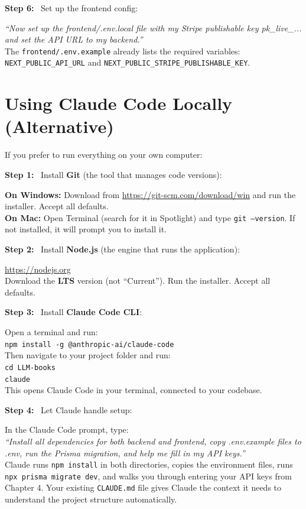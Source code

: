 \documentclass[12pt, letterpaper, oneside]{book}
\newcommand{\step}[1]{\noindent\textbf{\textcolor{primary}{Step #1:}}~}
\begin{document}
\step{6} Set up the frontend config:
\begin{actionbox}
\textit{``Now set up the frontend/.env.local file with my Stripe publishable key pk\_live\_... and set the API URL to my backend.''}\\[4pt]
The \texttt{frontend/.env.example} already lists the required variables: \texttt{NEXT\_PUBLIC\_API\_URL} and \texttt{NEXT\_PUBLIC\_STRIPE\_PUBLISHABLE\_KEY}.
\end{actionbox}

\section{Using Claude Code Locally (Alternative)}

If you prefer to run everything on your own computer:

\step{1} Install \textbf{Git} (the tool that manages code versions):
\begin{actionbox}
\textbf{On Windows:} Download from \url{https://git-scm.com/download/win} and run the installer. Accept all defaults.\\[4pt]
\textbf{On Mac:} Open Terminal (search for it in Spotlight) and type \texttt{git --version}. If not installed, it will prompt you to install it.
\end{actionbox}

\step{2} Install \textbf{Node.js} (the engine that runs the application):
\begin{actionbox}
\url{https://nodejs.org}\\[4pt]
Download the \textbf{LTS} version (not ``Current''). Run the installer. Accept all defaults.
\end{actionbox}

\step{3} Install \textbf{Claude Code CLI}:
\begin{actionbox}
Open a terminal and run:\\[4pt]
\texttt{npm install -g @anthropic-ai/claude-code}\\[4pt]
Then navigate to your project folder and run:\\[4pt]
\texttt{cd LLM-books}\\
\texttt{claude}\\[4pt]
This opens Claude Code in your terminal, connected to your codebase.
\end{actionbox}

\step{4} Let Claude handle setup:
\begin{actionbox}
In the Claude Code prompt, type:\\[4pt]
\textit{``Install all dependencies for both backend and frontend, copy .env.example files to .env, run the Prisma migration, and help me fill in my API keys.''}\\[4pt]
Claude runs \texttt{npm install} in both directories, copies the environment files, runs \texttt{npx prisma migrate dev}, and walks you through entering your API keys from Chapter 4. Your existing \texttt{CLAUDE.md} file gives Claude the context it needs to understand the project structure automatically.
\end{actionbox}
\end{document}
